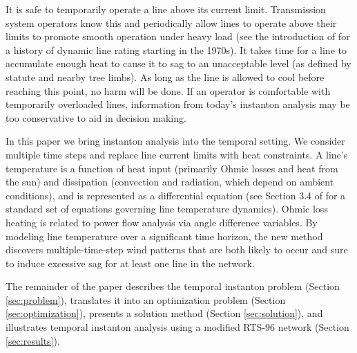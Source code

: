 \documentclass[conference]{IEEEtran}
\begin{document}
It is safe to temporarily operate a line above its current limit. Transmission system operators know this and periodically allow lines to operate above their limits to promote smooth operation under heavy load (see the introduction of \cite{banakar2005} for a history of dynamic line rating starting in the 1970s). It takes time for a line to accumulate enough heat to cause it to sag to an unacceptable level (as defined by statute and nearby tree limbs). As long as the line is allowed to cool before reaching this point, no harm will be done. If an operator is comfortable with temporarily overloaded lines, information from today's instanton analysis may be too conservative to aid in decision making.

In this paper we bring instanton analysis into the temporal setting. We consider multiple time steps and replace line current limits with heat constraints. A line's temperature is a function of heat input (primarily Ohmic losses and heat from the sun) and dissipation (convection and radiation, which depend on ambient conditions), and is represented as a differential equation (see Section 3.4 of \cite{ieee2007} for a standard set of equations governing line temperature dynamics). Ohmic loss heating is related to power flow analysis via angle difference variables. By modeling line temperature over a significant time horizon, the new method discovers multiple-time-step wind patterns that are both likely to occur and sure to induce excessive sag for at least one line in the network.

The remainder of the paper describes the temporal instanton problem (Section \ref{sec:problem}), translates it into an optimization problem (Section \ref{sec:optimization}), presents a solution method (Section \ref{sec:solution}), and illustrates temporal instanton analysis using a modified RTS-96 network (Section \ref{sec:results}).
\end{document}
